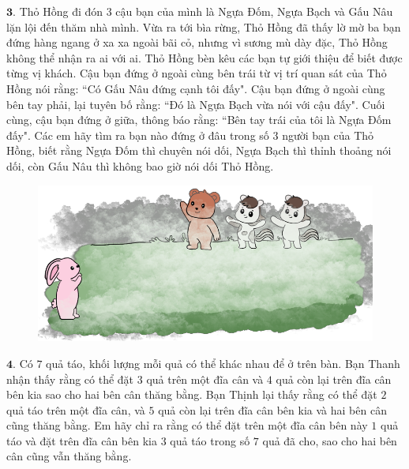 \begin{multicols}{2}
\begin{figure}[H]
		\vspace*{-15pt}
	\end{figure}
	$\pmb{3.}$ Thỏ Hồng đi đón $3$ cậu bạn của mình là Ngựa Đốm, Ngựa Bạch và Gấu Nâu lặn lội đến thăm nhà mình. Vừa ra tới bìa rừng, Thỏ Hồng đã thấy lờ mờ ba bạn đứng hàng ngang ở xa xa ngoài bãi cỏ, nhưng vì sương mù dày đặc, Thỏ Hồng không thể nhận ra ai với ai. Thỏ Hồng bèn kêu các bạn tự giới thiệu để biết được từng vị khách. Cậu bạn đứng ở ngoài cùng bên trái từ vị trí quan sát của Thỏ Hồng nói rằng: ``Có Gấu Nâu đứng cạnh tôi đấy". Cậu bạn đứng ở ngoài cùng bên tay phải, lại tuyên bố rằng: ``Đó là Ngựa Bạch vừa nói với cậu đấy". Cuối cùng, cậu bạn đứng ở giữa, thông báo rằng: ``Bên tay trái của tôi là Ngựa Đốm đấy". Các em hãy tìm ra bạn nào đứng ở đâu trong số $3$ người bạn của Thỏ Hồng, biết rằng Ngựa Đốm thì chuyên nói dối, Ngựa Bạch thì thỉnh thoảng nói dối, còn Gấu Nâu thì không bao giờ nói dối Thỏ Hồng.
	\begin{figure}[H]
		\centering
		\vspace*{-5pt}
		\captionsetup{labelformat= empty, justification=centering}
		\includegraphics[width=1\linewidth]{Pi9_bai3}
		\vspace*{-15pt}
	\end{figure}
	$\pmb{4.}$ Có $7$ quả táo, khối lượng mỗi quả có thể khác nhau để ở trên bàn. Bạn Thanh nhận thấy rằng có thể đặt $3$ quả trên một đĩa cân và $4$ quả còn lại trên đĩa cân bên kia sao cho hai bên cân thăng bằng. Bạn Thịnh lại thấy rằng có thể đặt $2$ quả táo trên một đĩa cân, và $5$ quả còn lại trên đĩa cân bên kia và hai bên cân cũng thăng bằng. Em hãy chỉ ra rằng có thể đặt trên một đĩa cân bên này $1$ quả táo và đặt trên đĩa cân bên kia $3$ quả táo trong số $7$ quả đã cho, sao cho hai bên cân cũng vẫn thăng bằng.
	\begin{figure}[H]
		\centering
		\vspace*{-5pt}
		\captionsetup{labelformat= empty, justification=centering}

\end{figure}
\end{multicols}

